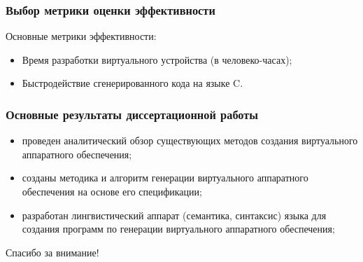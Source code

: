\begin{frame}%
    \frametitle{Выбор метрики оценки эффективности}
    Основные метрики эффективности:
    \begin{itemize}
        \item Время разработки виртуального устройства (в человеко-часах);
        \item Быстродействие сгенерированного кода на языке C.
    \end{itemize}
\end{frame}


\begin{frame}%
    \frametitle{Основные результаты диссертационной работы}
    \begin{itemize}
        \item проведен аналитический обзор существующих методов создания виртуального аппаратного обеспечения;
        \item созданы методика и алгоритм генерации виртуального аппаратного обеспечения на основе его спецификации;
        \item разработан лингвистический аппарат (семантика, синтаксис) языка для создания программ по генерации виртуального
            аппаратного обеспечения;
    \end{itemize}
\end{frame}


\begin{frame}%
    \begin{center}
        \Huge Спасибо за внимание!
    \end{center}
\end{frame}
